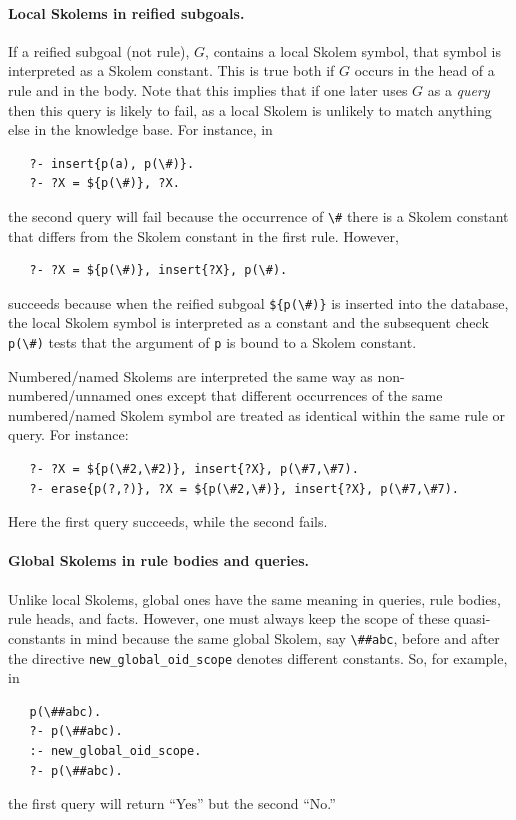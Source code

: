 \documentclass[11pt]{article}
\begin{document}
\paragraph{Local Skolems in reified subgoals.}
If a reified subgoal (not rule), $G$, contains a local Skolem symbol, that symbol is
interpreted as a Skolem constant. This is true both if $G$ occurs in the head
of a rule and in the body.
Note that this implies that if one later uses $G$ as a \emph{query} then
this query is likely to fail, as a local Skolem is unlikely to match
anything else in the knowledge base.
For instance, in
\begin{verbatim}
   ?- insert{p(a), p(\#)}.
   ?- ?X = ${p(\#)}, ?X.
\end{verbatim}
the second query will fail because the occurrence of \verb|\#| there is a
Skolem constant that differs from the Skolem constant in the first rule.
However,
\begin{verbatim}
   ?- ?X = ${p(\#)}, insert{?X}, p(\#).
\end{verbatim}
succeeds because when the reified subgoal \verb|${p(\#)}| is inserted into the
database, the local Skolem symbol is interpreted as a constant and the subsequent
check \verb|p(\#)| tests that the argument of \texttt{p} is bound to a
Skolem constant. 

Numbered/named Skolems are interpreted the same way as non-numbered/unnamed
ones except
that different occurrences of the same numbered/named Skolem symbol are treated
as identical within the same rule or query.
For instance:
\begin{verbatim}
   ?- ?X = ${p(\#2,\#2)}, insert{?X}, p(\#7,\#7).
   ?- erase{p(?,?)}, ?X = ${p(\#2,\#)}, insert{?X}, p(\#7,\#7).
\end{verbatim}
Here the first query succeeds, while the second fails.

\paragraph{Global Skolems in rule bodies and queries.}
Unlike local Skolems, global ones have the same meaning in queries,
rule bodies, rule heads, and facts. However, one must always keep the scope of
these quasi-constants in mind because the same global Skolem, say
\verb|\##abc|, before and after
the directive \texttt{new\_global\_oid\_scope}  denotes different
constants. So, for example, in
\begin{verbatim}
   p(\##abc).
   ?- p(\##abc).
   :- new_global_oid_scope.
   ?- p(\##abc).
\end{verbatim}
the first query will return ``Yes'' but the second ``No.''
\end{document}
